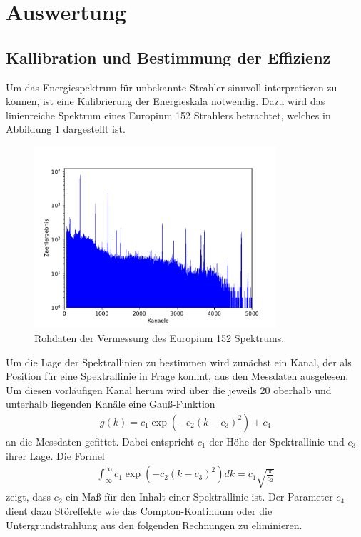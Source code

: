 \section{Auswertung}
\label{sec:Auswertung}

\subsection{Kallibration und Bestimmung der Effizienz}
\label{subsec:a1}
Um das Energiespektrum für unbekannte Strahler sinnvoll interpretieren zu können,
ist eine Kalibrierung der Energieskala notwendig. Dazu wird das linienreiche Spektrum eines Europium 152 Strahlers betrachtet, welches in Abbildung \ref{fig:spektrum_eu} dargestellt ist.
\begin{figure}
 \centering
 \includegraphics[width=0.8\textwidth]{python/plots/spec1.pdf}
 \caption{Rohdaten der Vermessung des Europium 152 Spektrums.}
 \label{fig:spektrum_eu}
 \end{figure} 
Um die Lage der Spektrallinien zu bestimmen wird zunächst ein Kanal, der als Position für eine Spektrallinie in Frage kommt, aus den Messdaten ausgelesen. 
Um diesen vorläufigen Kanal herum wird über die jeweils 20 oberhalb und unterhalb liegenden Kanäle eine Gauß-Funktion
\begin{align}
g(k)=c_1\exp\left(-c_2(k-c_3)^2\right)+c_4
\end{align}
an die Messdaten gefittet.
Dabei entspricht $c_1$ der Höhe der Spektrallinie und $c_3$ ihrer Lage.
Die Formel
\begin{align}
\int_\infty^\infty c_1\exp\left(-c_2(k-c_3)^2\right) dk = c_1 \sqrt{\frac{\pi}{c_2}}
\end{align}
zeigt, dass $c_2$ ein Maß für den Inhalt einer Spektrallinie ist.
Der Parameter $c_4$ dient dazu Störeffekte wie das Compton-Kontinuum oder die Untergrundstrahlung aus den folgenden Rechnungen zu eliminieren.
